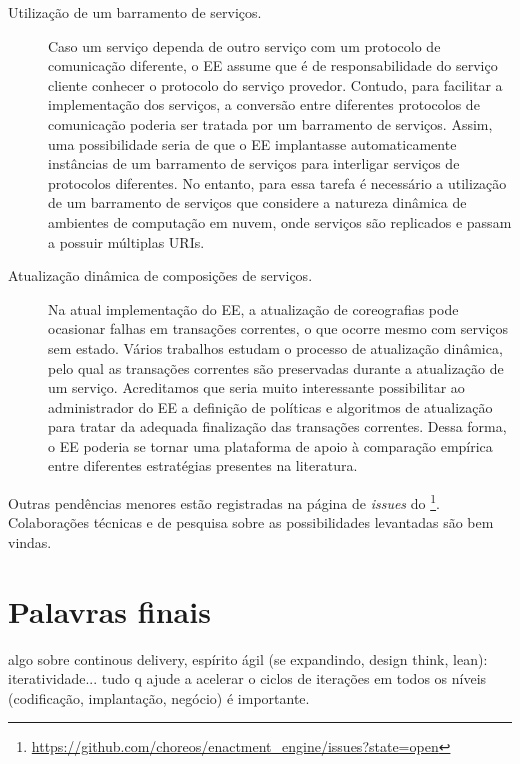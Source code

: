 \begin{description}
\item[Utilização de um barramento de serviços.] Caso um serviço dependa
de outro serviço com um protocolo de comunicação diferente, o EE assume que é de
responsabilidade do serviço cliente conhecer o protocolo do serviço provedor.
Contudo, para facilitar a implementação dos serviços, a conversão entre
diferentes protocolos de comunicação poderia ser tratada por um barramento de serviços.
Assim, uma possibilidade seria de que o EE implantasse automaticamente instâncias
de um barramento de serviços para interligar serviços de protocolos diferentes.
No entanto, para essa tarefa é necessário a utilização de um barramento de serviços
que considere a natureza dinâmica de ambientes de computação em nuvem,
onde serviços são replicados e passam a possuir múltiplas URIs.

\item[Atualização dinâmica de composições de serviços.] Na atual implementação do EE,
a atualização de coreografias pode ocasionar falhas em transações correntes,
o que ocorre mesmo com serviços sem estado.
Vários trabalhos \cite{Kramer1990Philosophers, Vandewoude2007Tranquility, Xiaoxing2011VersionConsistent} 
estudam o processo de atualização dinâmica, pelo qual as transações correntes 
são preservadas durante a atualização de um serviço. 
Acreditamos que seria muito interessante possibilitar ao administrador do EE
a definição de políticas e algoritmos de atualização para 
tratar da adequada finalização das transações correntes.
Dessa forma, o EE poderia se tornar uma plataforma de apoio
à comparação empírica entre diferentes estratégias presentes na literatura.

\end{description}

Outras pendências menores estão registradas na página de \emph{issues} 
do \ee\footnote{\url{https://github.com/choreos/enactment_engine/issues?state=open}}.
Colaborações técnicas e de pesquisa sobre as possibilidades levantadas
são bem vindas.


\section{Palavras finais}


algo sobre continous delivery, espírito ágil (se expandindo, design think, lean): iteratividade... 
tudo q ajude a acelerar o ciclos de iterações em todos os níveis
(codificação, implantação, negócio) é importante.

